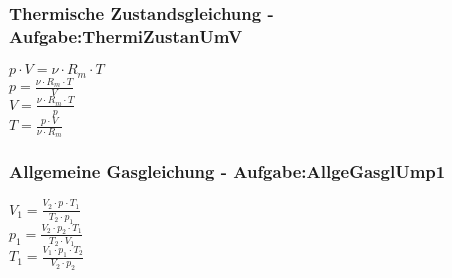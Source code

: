 \subsubsection{Thermische Zustandsgleichung - Aufgabe:ThermiZustanUmV} 
\begin{minipage}{0.45\textwidth} 
$ p\cdot V =\nu \cdot R_{m} \cdot T $\\ 
$ p =\frac{\nu \cdot R_{m} \cdot T}{  V} $\\ 
$ V =\frac{\nu \cdot R_{m} \cdot T}{  p} $\\ 
$ T =\frac{p\cdot V}{\nu \cdot R_{m} } $\\ 
\end{minipage} 
\begin{minipage}{0.45\textwidth} 
 
\end{minipage} 
\subsubsection{Allgemeine Gasgleichung - Aufgabe:AllgeGasglUmp1} 
\begin{minipage}{0.45\textwidth} 
$ V_{1}  = \frac{V_{2} \cdot p_{} \cdot T_{1} }{  T_{2} \cdot p_{1} } $\\ 
$ p_{1}  = \frac{V_{2} \cdot p_{2} \cdot T_{1} }{  T_{2} \cdot V_{1} } $\\ 
$ T_{1}  = \frac{V_{1} \cdot p_{1} \cdot T_{2} }{  V_{2} \cdot p_{2} } $\\ 
\end{minipage} 
\begin{minipage}{0.45\textwidth} 
 
\end{minipage} 
